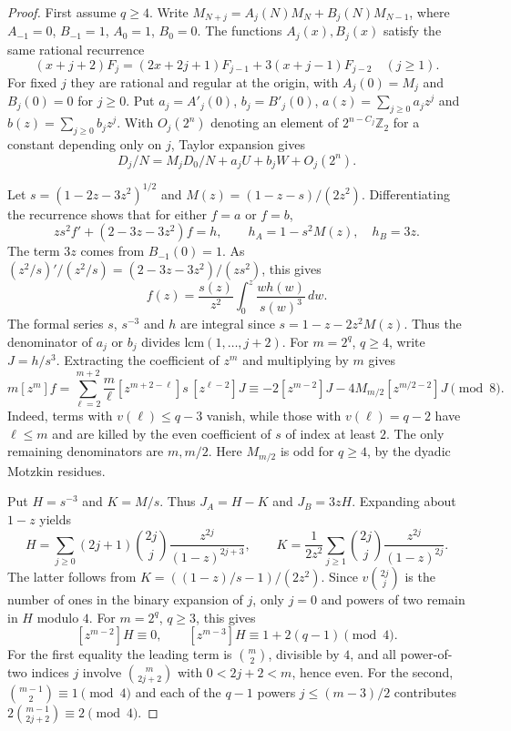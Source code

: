 \documentclass[11pt,a4paper]{article}
\begin{document}
\begin{proof}
First assume $q\ge4$. Write $M_{N+j}=A_j(N)M_N+B_j(N)M_{N-1}$, where $A_{-1}=0$, $B_{-1}=1$, $A_0=1$, $B_0=0$. The functions $A_j(x),B_j(x)$ satisfy the same rational recurrence
\[
 (x+j+2)F_j=(2x+2j+1)F_{j-1}+3(x+j-1)F_{j-2}\quad(j\ge1).
\]
For fixed $j$ they are rational and regular at the origin, with $A_j(0)=M_j$ and $B_j(0)=0$ for $j\ge0$. Put $a_j=A'_j(0)$, $b_j=B'_j(0)$, $a(z)=\sum_{j\ge0}a_jz^j$ and $b(z)=\sum_{j\ge0}b_jz^j$. With $O_j(2^n)$ denoting an element of $2^{n-C_j}\mathbb Z_2$ for a constant depending only on $j$, Taylor expansion gives
\[
 D_j/N=M_jD_0/N+a_j U+b_jW+O_j(2^n).
\]

Let $s=(1-2z-3z^2)^{1/2}$ and $M(z)=(1-z-s)/(2z^2)$. Differentiating the recurrence shows that for either $f=a$ or $f=b$,
\[
 zs^2 f'+(2-3z-3z^2)f=h,\qquad
 h_A=1-s^2M(z),\quad h_B=3z.
\]
The term $3z$ comes from $B_{-1}(0)=1$. As $(z^2/s)'/(z^2/s)=(2-3z-3z^2)/(zs^2)$, this gives
\[
 f(z)=\frac{s(z)}{z^2}\int_0^z\frac{w h(w)}{s(w)^3}\,dw.
\]
The formal series $s$, $s^{-3}$ and $h$ are integral since $s=1-z-2z^2M(z)$. Thus the denominator of $a_j$ or $b_j$ divides $\mathrm{lcm}(1,\ldots,j+2)$. For $m=2^q$, $q\ge4$, write $J=h/s^3$. Extracting the coefficient of $z^m$ and multiplying by $m$ gives
\[
 m[z^m]f=\sum_{\ell=2}^{m+2}\frac m\ell [z^{m+2-\ell}]s\,[z^{\ell-2}]J
 \equiv -2[z^{m-2}]J-4M_{m/2}[z^{m/2-2}]J\pmod8 .
\]
Indeed, terms with $v(\ell)\le q-3$ vanish, while those with $v(\ell)=q-2$ have $\ell\le m$ and are killed by the even coefficient of $s$ of index at least $2$. The only remaining denominators are $m,m/2$. Here $M_{m/2}$ is odd for $q\ge4$, by the dyadic Motzkin residues.

Put $H=s^{-3}$ and $K=M/s$. Thus $J_A=H-K$ and $J_B=3zH$. Expanding about $1-z$ yields
\[
 H=\sum_{j\ge0}(2j+1)\binom{2j}{j}\frac{z^{2j}}{(1-z)^{2j+3}},
 \qquad
 K=\frac1{2z^2}\sum_{j\ge1}\binom{2j}{j}\frac{z^{2j}}{(1-z)^{2j}}.
\]
The latter follows from $K=((1-z)/s-1)/(2z^2)$. Since $v\binom{2j}{j}$ is the number of ones in the binary expansion of $j$, only $j=0$ and powers of two remain in $H$ modulo $4$. For $m=2^q$, $q\ge3$, this gives
\[
 [z^{m-2}]H\equiv0,\qquad [z^{m-3}]H\equiv 1+2(q-1)\pmod4.
\]
For the first equality the leading term is $\binom{m}{2}$, divisible by $4$, and all power-of-two indices $j$ involve $\binom{m}{2j+2}$ with $0<2j+2<m$, hence even. For the second, $\binom{m-1}{2}\equiv1\pmod4$ and each of the $q-1$ powers $j\le(m-3)/2$ contributes $2\binom{m-1}{2j+2}\equiv2\pmod4$.


\end{proof}
\end{document}
